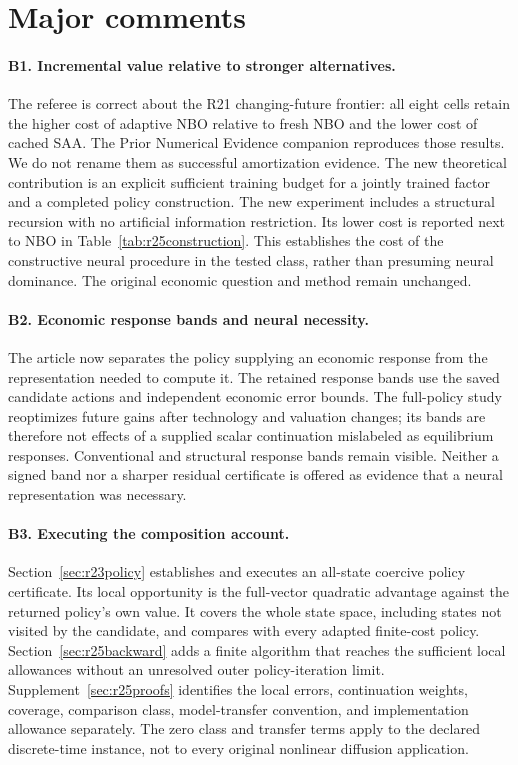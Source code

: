 \section*{Major comments}
\paragraph*{B1. Incremental value relative to stronger alternatives.}
The referee is correct about the R21 changing-future frontier: all eight
cells retain the higher cost of adaptive NBO relative to fresh NBO and the
lower cost of cached SAA. The Prior Numerical Evidence companion reproduces
those results. We do not rename them as successful amortization evidence.
The new theoretical contribution is an explicit sufficient training budget
for a jointly trained factor and a completed policy construction. The new
experiment includes a structural recursion with no artificial information
restriction. Its lower cost is reported next to NBO in
Table~\ref{tab:r25construction}. This establishes the cost of the constructive
neural procedure in the tested class, rather than presuming neural dominance.
The original economic question and method remain unchanged.

\paragraph*{B2. Economic response bands and neural necessity.}
The article now separates the policy supplying an economic response from the
representation needed to compute it. The retained response bands use the
saved candidate actions and independent economic error bounds. The full-policy
study reoptimizes future gains after technology and valuation changes; its
bands are therefore not effects of a supplied scalar continuation mislabeled
as equilibrium responses. Conventional and structural response bands remain
visible. Neither a signed band nor a sharper residual certificate is offered
as evidence that a neural representation was necessary.

\paragraph*{B3. Executing the composition account.}
Section~\ref{sec:r23policy} establishes and executes an all-state coercive
policy certificate. Its local opportunity is the full-vector quadratic
advantage against the returned policy's own value. It covers the whole
state space, including states not visited by the candidate, and compares
with every adapted finite-cost policy. Section~\ref{sec:r25backward} adds a
finite algorithm that reaches the sufficient local allowances without an
unresolved outer policy-iteration limit. Supplement~\ref{sec:r25proofs}
identifies the local errors, continuation weights, coverage, comparison
class, model-transfer convention, and implementation allowance separately.
The zero class and transfer terms apply to the declared discrete-time
instance, not to every original nonlinear diffusion application.

